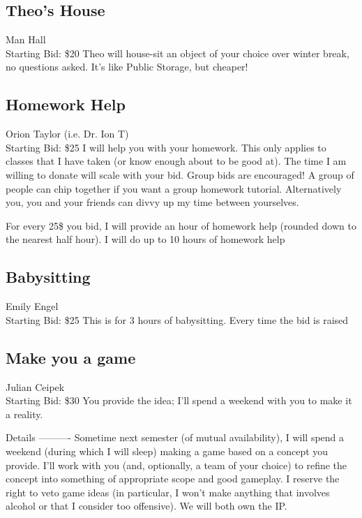 \documentclass[11pt]{article}
\begin{document}
\subsection{Theo's House}
Man Hall
\\
Starting Bid: \$20
\newline
Theo will house-sit an object of your choice over winter break, no questions asked. It's like Public Storage, but cheaper!
\subsection{Homework Help}
Orion Taylor (i.e. Dr. Ion T)
\\
Starting Bid: \$25
\newline
I will help you with your homework. This only applies to classes that I have taken (or know enough about to be good at). The time I am willing to donate will scale with your bid. Group bids are encouraged! A group of people can chip together if you want a group homework tutorial. Alternatively you, you and your friends can divvy up my time between yourselves.

For every 25\$ you bid, I will provide an hour of homework help (rounded down to the nearest half hour). I will do up to 10 hours of homework help
\subsection{Babysitting}
Emily Engel
\\
Starting Bid: \$25
\newline
This is for 3 hours of babysitting.  Every time the bid is raised %
\subsection{Make you a game}
Julian Ceipek
\\
Starting Bid: \$30
\newline
You provide the idea; I'll spend a weekend with you to make it a reality.

Details
----------
Sometime next semester (of mutual availability), I will spend a weekend (during which I will sleep) making a game based on a concept you provide. I'll work with you (and, optionally, a team of your choice) to refine the concept into something of appropriate scope and good gameplay. I reserve the right to veto game ideas (in particular, I won't make anything that involves alcohol or that I consider too offensive). We will both own the IP.
\end{document}
